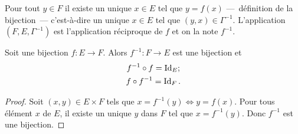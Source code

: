Pour tout \(y \in F\) il existe un unique \(x \in E\) tel que \(y=f(x)\) ---~définition de la bijection~--- c'est-à-dire un unique \(x \in E\) tel que \((y,x) \in \Gamma^{-1}\). L'application \((F,E,\Gamma^{-1})\) est l'application réciproque de \(f\) et on la note \(f^{-1}\).
%
\begin{prop} Soit une bijection \(f : E \longrightarrow F\). Alors \(f^{-1} : F \longrightarrow E\) est une bijection et
  \begin{gather}
    f^{-1} \circ f =\operatorname{Id}_E; \\
    f \circ f^{-1}=\operatorname{Id}_F.
  \end{gather}
\end{prop}
\begin{proof}
Soit \((x,y) \in E \times F\) tels que \(x=f^{-1}(y) \iff y=f(x)\). Pour tous élément \(x\) de \(E\), il existe un unique \(y\) dans \(F\) tel que \(x=f^{-1}(y)\). Donc \(f^{-1}\) est une bijection.
\end{proof}
